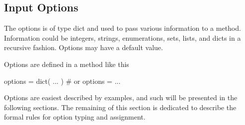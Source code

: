 \subsection{Input Options}

The options is of type dict and used to pass various information to a
method.  Information could be integers, strings, enumerations, sets,
lists, and dicts in a recursive fashion.  Options may have a default
value.

Options are defined in a method like this

\begin{python}
  options = dict( ... )  # or
  options = { ... }
\end{python}

Options are easiest described by examples, and such will be presented
in the following sections.  The remaining of this section is dedicated
to describe the formal rules for option typing and assignment.

